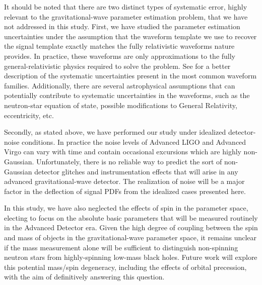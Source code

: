 \documentclass[11pt,a4paper]{emulateapj} 
\begin{document}
It should be noted that there are two distinct types of systematic
error, highly relevant to the gravitational-wave parameter estimation
problem, that we have not addressed in this study.  First, we have
studied the parameter estimation uncertainties under the assumption
that the waveform template we use to recover the signal template
exactly matches the fully relativistic waveforms nature provides.  In
practice, these waveforms are only approximations to the fully
general-relativistic physics required to solve the problem.  See
\cite{BuonannoWaveform} for a better description of the systematic uncertainties
present in the most common waveform families.  Additionally, there are
several astrophysical assumptions that can potentially contribute to
systematic uncertainties in the waveforms, such as the neutron-star
equation of state, possible modifications to General Relativity,
eccentricity, etc.

Secondly, as stated above, we have performed our study under idealized
detector-noise conditions.  In practice the noise levels of Advanced
LIGO and Advanced Virgo can vary with time and contain occasional
excursions which are highly non-Gaussian.  Unfortunately, there is no
reliable way to predict the sort of non-Gaussian detector glitches and
instrumentation effects that will arise in any advanced
gravitational-wave detector.  The realization of noise will be a
major factor in the deflection of signal PDFs from the idealized cases
presented here.


In this study, we have also neglected the effects of spin in the
parameter space, electing to focus on the absolute basic parameters
that will be measured routinely in the Advanced Detector era.  Given
the high degree of coupling between the spin and mass of objects
in the gravitational-wave parameter space, it remains unclear if the
mass measurement alone will be sufficient to distinguish non-spinning
neutron stars from highly-spinning low-mass black holes.  Future work
will explore this potential mass/spin degeneracy, including the
effects of orbital precession, with the aim of definitively answering
this question.

 {}
\end{document}
